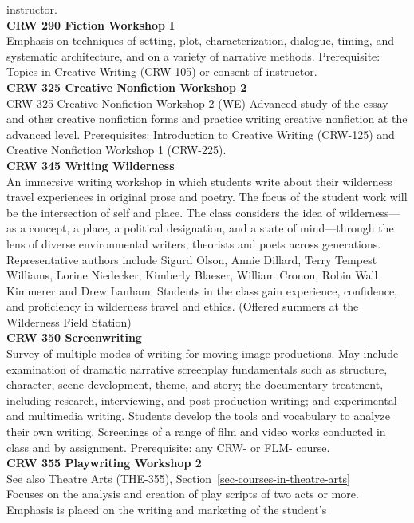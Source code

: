 \documentclass[
  letterpaper,
]{scrbook}
\begin{document}
instructor.\\
\textbf{CRW 290 Fiction Workshop I}\\
Emphasis on techniques of setting, plot, characterization, dialogue,
timing, and systematic architecture, and on a variety of narrative
methods. Prerequisite: Topics in Creative Writing (CRW-105) or consent
of instructor.\\
\textbf{CRW 325 Creative Nonfiction Workshop 2}\\
CRW-325 Creative Nonfiction Workshop 2 (WE) Advanced study of the essay
and other creative nonfiction forms and practice writing creative
nonfiction at the advanced level. Prerequisites: Introduction to
Creative Writing (CRW-125) and Creative Nonfiction Workshop 1
(CRW-225).\\
\textbf{CRW 345 Writing Wilderness}\\
An immersive writing workshop in which students write about their
wilderness travel experiences in original prose and poetry. The focus of
the student work will be the intersection of self and place. The class
considers the idea of wilderness---as a concept, a place, a political
designation, and a state of mind---through the lens of diverse
environmental writers, theorists and poets across generations.
Representative authors include Sigurd Olson, Annie Dillard, Terry
Tempest Williams, Lorine Niedecker, Kimberly Blaeser, William Cronon,
Robin Wall Kimmerer and Drew Lanham. Students in the class gain
experience, confidence, and proficiency in wilderness travel and ethics.
(Offered summers at the Wilderness Field Station)\\
\textbf{CRW 350 Screenwriting}\\
Survey of multiple modes of writing for moving image productions. May
include examination of dramatic narrative screenplay fundamentals such
as structure, character, scene development, theme, and story; the
documentary treatment, including research, interviewing, and
post-production writing; and experimental and multimedia writing.
Students develop the tools and vocabulary to analyze their own writing.
Screenings of a range of film and video works conducted in class and by
assignment. Prerequisite: any CRW- or FLM- course.\\
\textbf{CRW 355 Playwriting Workshop 2}\\
See also Theatre Arts (THE-355),
Section~\ref{sec-courses-in-theatre-arts}\\
Focuses on the analysis and creation of play scripts of two acts or
more. Emphasis is placed on the writing and marketing of the student's
\end{document}
